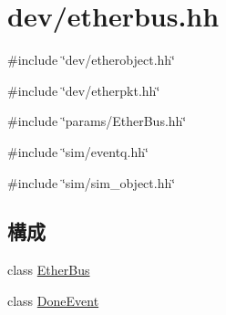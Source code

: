 \hypertarget{etherbus_8hh}{
\section{dev/etherbus.hh}
\label{etherbus_8hh}
}
{\ttfamily \#include \char`\"{}dev/etherobject.hh\char`\"{}}\par
{\ttfamily \#include \char`\"{}dev/etherpkt.hh\char`\"{}}\par
{\ttfamily \#include \char`\"{}params/EtherBus.hh\char`\"{}}\par
{\ttfamily \#include \char`\"{}sim/eventq.hh\char`\"{}}\par
{\ttfamily \#include \char`\"{}sim/sim\_\-object.hh\char`\"{}}\par
\subsection*{構成}
\begin{DoxyCompactItemize}
\item 
class \hyperlink{classEtherBus}{EtherBus}
\item 
class \hyperlink{classEtherBus_1_1DoneEvent}{DoneEvent}
\end{DoxyCompactItemize}
